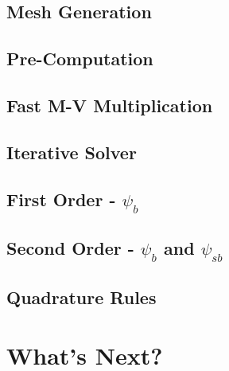 \documentclass [10pt,letterpaper]{article}
\begin{document}
\subsection{Mesh Generation}
\label{sub:mesh-generation}
\subsection{Pre-Computation}
\label{sub:pre-computation}
\subsection{Fast M-V Multiplication}
\label{sub:fast-M-V-multiplication}
\subsection{Iterative Solver}
\label{sub:iterative-solver}
\subsection{First Order - $\psi_b$}
\label{sub:first-order-psib}
\subsection{Second Order - $\psi_b$ and $\psi_{sb}$}
\label{sub:second-order-psib-and-psisb} 
\subsection{Quadrature Rules}
\label{sub:quadrature-rules}
\section{What's Next?}
\label{sec:whats-next}
\end{document}
